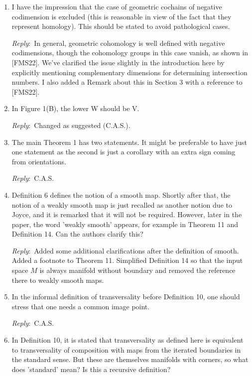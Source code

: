 \documentclass{amsart}
\newcommand{\ar}{\medskip\noindent\textit{Reply}:\ }
\newcommand{\cas}{\ar C.A.S.}
\begin{document}
\begin{enumerate}
	\item I have the impression that the case of geometric cochains of negative codimension is excluded (this is reasonable in view of the fact that they represent homology). This should be stated to avoid pathological cases.

	\ar In general, geometric cohomology is well defined with negative codimensions, though the cohomology groups in this case vanish, as shown in [FMS22]. We've clarified the issue slightly in the introduction here by explicitly mentioning complementary dimensions for determining intersection numbers. I also added a Remark about this in Section 3 with a reference to [FMS22].

	\item In Figure 1(B), the lower W should be V.

	\ar Changed as suggested (C.A.S.).

	\item The main Theorem 1 has two statements. It might be preferable to have just one statement as the second is just a corollary with an extra sign coming from orientations.

	\cas

	\item Definition 6 defines the notion of a smooth map. Shortly after that, the notion of a weakly smooth map is just recalled as another notion due to Joyce, and it is remarked that it will not be required. However, later in the paper, the word 'weakly smooth' appears, for example in Theorem 11 and Definition 14. Can the authors clarify this?

	\ar Added some additional clarifications after the definition of smooth. Added a footnote to Theorem 11. Simplified Definition 14 so that the input space $M$ is always manifold without boundary and removed the reference there to weakly smooth maps.

	\item In the informal definition of transversality before Definition 10, one should stress that one needs a common image point.

	\cas

	\item In Definition 10, it is stated that transversality as defined here is equivalent to transversality of composition with maps from the iterated boundaries in the standard sense. But these are themselves manifolds with corners, so what does 'standard' mean? Is this a recursive definition?


\end{enumerate}
\end{document}
